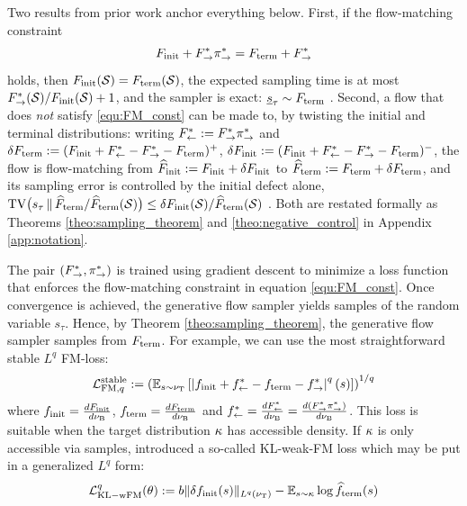   Two results from prior work anchor everything below. First, if the flow-matching constraint
\begin{equation}
\label{equ:FM_const}
    F_{\mathrm{init}} + F^*_{\rightarrow}\pi_{\rightarrow}^* = F_{\mathrm{term}} + F^*_{\rightarrow}
\end{equation}
holds, then $F_{\mathrm{init}}(\mathcal S)=F_{\mathrm{term}}(\mathcal S)$, the expected sampling time is at most
$F^*_{\rightarrow}(\mathcal S)/F_{\mathrm{init}}(\mathcal S)+1$, and the sampler is exact:
$\underline s_\tau\sim F_{\mathrm{term}}$ \cite{bengio2021flow, brunswic2024theory}. Second, a flow that
does \emph{not} satisfy \eqref{equ:FM_const} can be made to, by twisting the initial and
terminal distributions: writing $F^*_{\leftarrow} := F^*_{\rightarrow}\pi_{\rightarrow}^*$ and
$\delta F_{\mathrm{term}} := (F_{\mathrm{init}}+F^*_{\leftarrow}-F^*_{\rightarrow}-F_{\mathrm{term}})^+$,
$\delta F_{\mathrm{init}} := (F_{\mathrm{init}}+F^*_{\leftarrow}-F^*_{\rightarrow}-F_{\mathrm{term}})^-$, the flow is flow-matching from
$\widehat {F}_{\mathrm{init}} := F_{\mathrm{init}}+\delta F_{\mathrm{init}}$ to $\widehat{F}_{\mathrm{term}} := F_{\mathrm{term}}+\delta F_{\mathrm{term}}$, and its sampling
error is controlled by the initial defect alone,
$\mathrm{TV}\bigl(s_\tau\,\|\,\widehat{F}_{\mathrm{term}}/\widehat{F}_{\mathrm{term}}(\mathcal S)\bigr)\leq\delta F_{\mathrm{init}}(\mathcal S)/\widehat{F}_{\mathrm{term}}(\mathcal S)$
\cite{brunswicEGF}. Both are restated formally as Theorems \ref{theo:sampling_theorem} and
\ref{theo:negative_control} in Appendix \ref{app:notation}.

The pair $(F^*_{\rightarrow}, \pi_{\rightarrow}^*)$ is trained using gradient descent to minimize a loss function that enforces the flow-matching constraint in equation \eqref{equ:FM_const}. Once convergence is achieved, the generative flow sampler yields samples of the random variable $s_\tau$. Hence, by Theorem \ref{theo:sampling_theorem},  the generative flow sampler samples from $F_{\mathrm{term}}$. For example, we can use the most straightforward stable $L^q$ FM-loss:
    \begin{equation}\label{equ:FMloss}
        \mathcal L_{\mathrm{FM},q}^{\mathrm{stable}} := \left(\mathbb E_{s\sim \nu_{\mathrm{T}}}\left[ \left|f_{\mathrm{init}} + f^*_{\leftarrow} - f_{\mathrm{term}} - f^*_{\rightarrow}\right|^q(s) \right]\right)^{1/q}
    \end{equation}
    where $f_{\mathrm{init}} = \frac{dF_{\mathrm{init}}}{d\nu_{\mathrm{B}}}$, $f_{\mathrm{term}}=\frac{dF_{\mathrm{term}}}{d\nu_{\mathrm{B}}}$ and $f^*_{\leftarrow}=\frac{dF^*_{\leftarrow}}{d\nu_{\mathrm{B}}} = \frac{d(F^*_{\rightarrow}\pi_{\rightarrow}^*)}{d\nu_{\mathrm{B}}} $.
This loss is suitable when the target distribution $\kappa$ has accessible density.
If $\kappa$ is only accessible via samples, \cite{brunswicEGF} introduced a so-called KL-weak-FM loss which may be put in a generalized $L^q$ form:
\begin{equation}\label{equ:weakFM}
     \mathcal L_{\mathrm{KL-wFM}}^q (\theta) := b \|\delta f_{\mathrm{init}}(s)\|_{L^q(\nu_{\mathrm{T}})}-  \mathbb E_{s\sim \kappa}\log \widehat{f}_{\mathrm{term}}(s)
\end{equation}

